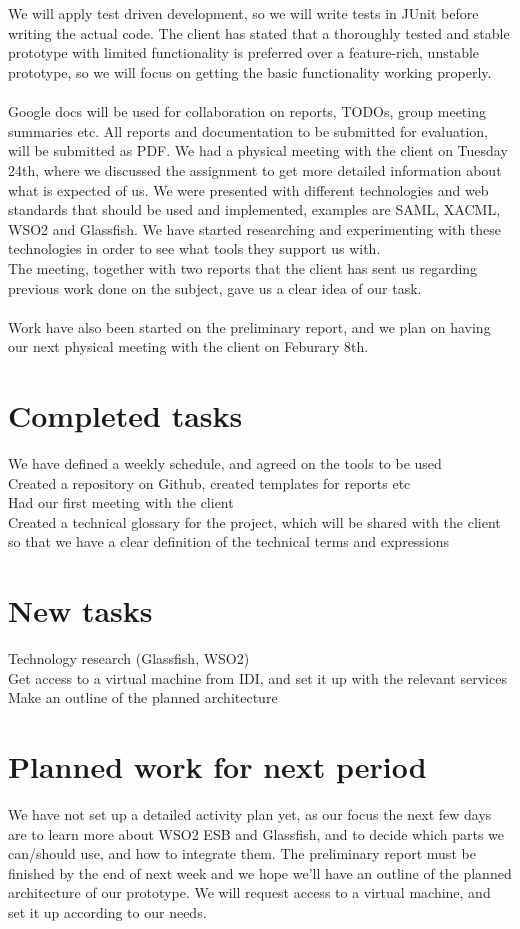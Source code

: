 \documentclass[titlepage]{article}
\begin{document}
\\\\
        We will apply test driven development, so we will write tests in JUnit before writing the actual code. The client has stated that a thoroughly tested and stable prototype with limited functionality is preferred over a feature-rich, unstable prototype, so we will focus on getting the basic functionality working properly.
\\\\
        Google docs will be used for collaboration on reports, TODOs, group meeting summaries etc. All reports and documentation to be submitted for evaluation, will be submitted as PDF.
We had a physical meeting with the client on Tuesday 24th, where we discussed the assignment to get more detailed information about what is expected of us. We were presented with different technologies and web standards that should be used and implemented, examples are SAML, XACML, WSO2 and Glassfish. We have started researching and experimenting with these technologies in order to see what tools they support us with. 
\\The meeting, together with two reports that the client has sent us regarding previous work done on the subject, gave us a clear idea of our task.
\\\\
        Work have also been started on the preliminary report, and we plan on having our next physical meeting with the client on Feburary 8th.


    \section*{Completed tasks}
        We have defined a weekly schedule, and agreed on the tools to be used
\\Created a repository on Github, created templates for reports etc
\\Had our first meeting with the client
\\Created a technical glossary for the project, which will be shared with the client so that we have a clear definition of the technical terms and expressions

    \section*{New tasks}
        Technology research (Glassfish, WSO2)
\\Get access to a virtual machine from IDI, and set it up with the relevant services
\\Make an outline of the planned architecture

    \section*{Planned work for next period}
        We have not set up a detailed activity plan yet, as our focus the next few days are to learn more about WSO2 ESB and Glassfish, and to decide which parts we can/should use, and how to integrate them. The preliminary report must be finished by the end of next week and we hope we’ll have an outline of the planned architecture of our prototype. We will request access to a virtual machine, and set it up according to our needs.
\end{document}
